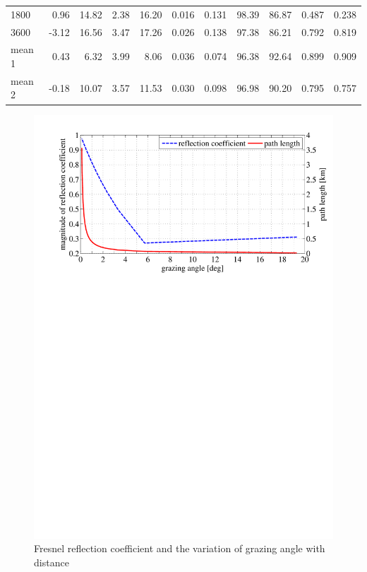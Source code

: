 \documentclass[10pt,journal,twoside]{IEEEtran}
\begin{document}
\begin{table}
\begin{tabular*}{0.85\linewidth}{ @{\extracolsep{\fill}} l*{10}r @{}}
        1800  & 0.96  & 14.82 & 2.38  & 16.20 & 0.016 & 0.131 & 98.39 & 86.87 & 0.487 & 0.238 \\
        3600  & -3.12 & 16.56 & 3.47  & 17.26 & 0.026 & 0.138 & 97.38 & 86.21 & 0.792 & 0.819 \\ \cmidrule{1-1} \cmidrule{2-3} \cmidrule{4-5} \cmidrule{6-7} \cmidrule{8-9} \cmidrule{10-11}
        mean 1 & 0.43  & 6.32  & 3.99  & 8.06  & 0.036 & 0.074 & 96.38 & 92.64 & 0.899 & 0.909 \\
        mean 2 & -0.18 & 10.07 & 3.57  & 11.53 & 0.030 & 0.098 & 96.98 & 90.20 & 0.795 & 0.757 \\
		\bottomrule
	\end{tabular*}%
\end{table}%
%
\begin{figure}
	\includegraphics[width=\linewidth]{ground_reflection_coefficient_grazing_angle}
	\caption{Fresnel reflection coefficient and the variation of grazing angle with distance}
	\label{fig:reflect_grazing}
\end{figure} %
\end{document}
